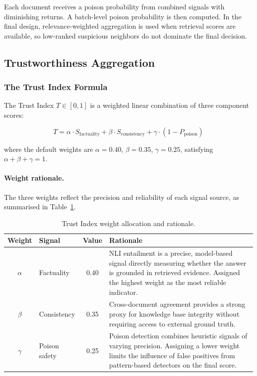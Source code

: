 Each document receives a poison probability from combined signals with diminishing returns. A batch-level poison probability is then computed. In the final design, relevance-weighted aggregation is used when retrieval scores are available, so low-ranked suspicious neighbors do not dominate the final decision.

\subsection{Trustworthiness Aggregation}
\label{subsec:ch5_trust_index}

\subsubsection{The Trust Index Formula}

The Trust Index $T \in [0,1]$ is a weighted linear combination of three component scores:

\begin{equation}
\label{eq:trust_index}
T = \alpha \cdot S_{\text{factuality}} + \beta \cdot S_{\text{consistency}} + \gamma \cdot (1 - P_{\text{poison}})
\end{equation}

where the default weights are $\alpha = 0.40$, $\beta = 0.35$, $\gamma = 0.25$, satisfying
$\alpha + \beta + \gamma = 1$.

\paragraph{Weight rationale.}
The three weights reflect the precision and reliability of each signal source, as summarised in
Table~\ref{tab:trust_weights}.

\begin{table}[h]
\centering
\caption{Trust Index weight allocation and rationale.}
\label{tab:trust_weights}
\begin{tabular}{clcp{6.5cm}}
\hline
\textbf{Weight} & \textbf{Signal} & \textbf{Value} & \textbf{Rationale} \\
\hline
$\alpha$ & Factuality  & 0.40 & NLI entailment is a precise, model-based signal directly measuring
                                whether the answer is grounded in retrieved evidence. Assigned the
                                highest weight as the most reliable indicator. \\
$\beta$  & Consistency & 0.35 & Cross-document agreement provides a strong proxy for knowledge base
                                integrity without requiring access to external ground truth. \\
$\gamma$ & Poison safety & 0.25 & Poison detection combines heuristic signals of varying precision.
                                  Assigning a lower weight limits the influence of false positives
                                  from pattern-based detectors on the final score. \\
\hline
\end{tabular}
\end{table}

